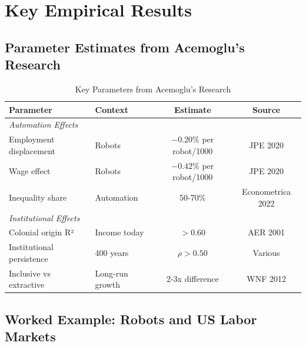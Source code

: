 \section{Key Empirical Results}

\subsection{Parameter Estimates from Acemoglu's Research}

\begin{table}[h]
\centering
\caption{Key Parameters from Acemoglu's Research}
\label{tab:acemoglu-parameters}
\begin{tabular}{llcc}
\toprule
\textbf{Parameter} & \textbf{Context} & \textbf{Estimate} & \textbf{Source} \\
\midrule
\multicolumn{4}{l}{\textit{Automation Effects}} \\
Employment displacement & Robots & $-0.20\%$ per robot/1000 & JPE 2020 \\
Wage effect & Robots & $-0.42\%$ per robot/1000 & JPE 2020 \\
Inequality share & Automation & 50-70\% & Econometrica 2022 \\
\midrule
\multicolumn{4}{l}{\textit{Institutional Effects}} \\
Colonial origin R² & Income today & $> 0.60$ & AER 2001 \\
Institutional persistence & 400 years & $\rho > 0.50$ & Various \\
Inclusive vs extractive & Long-run growth & 2-3x difference & WNF 2012 \\
\bottomrule
\end{tabular}
\end{table}

\subsection{Worked Example: Robots and US Labor Markets}

